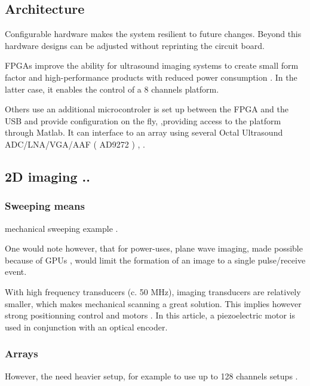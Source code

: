 \documentclass[conference]{IEEEtran}
\begin{document}
\subsection{Architecture}



Configurable hardware makes the system resilient to future changes.
Beyond this hardware designs can be adjusted without reprinting the circuit board.

FPGAs improve the ability for ultrasound imaging systems to create small form factor and high-performance products with reduced power consumption \cite{dusa_low_2014}. In the latter case, it enables the control of a 8 channels platform.
  
Others use  an  additional microcontroler is set up between the FPGA and the USB and provide configuration on the fly, ,providing access to the platform through Matlab. It can interface to an array using several Octal Ultrasound ADC/LNA/VGA/AAF ( AD9272 ) \cite{raj_microcontroller_2017}, \cite{raj_8051_2016}.


\subsection{2D imaging .. }

\subsubsection{Sweeping means}


mechanical sweeping example \cite{svilainis_electronics_2014}.


One would note however, that for power-uses, plane wave imaging, made possible because of GPUs \cite{hewener_mobile_2015}, would limit the formation of an image to a single pulse/receive event.


With high frequency transducers (c. 50 MHz), imaging transducers are relatively smaller, which makes mechanical scanning a great solution. This implies however strong positionning control and motors \cite{carotenuto_very_2004}. In this article, a piezoelectric	 motor is used in conjunction with an optical encoder. 


\subsubsection{Arrays}


However, the need heavier setup, for example to use up to 128 channels setups \cite{assef_flexible_2015}.
\end{document}
